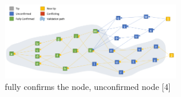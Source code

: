 \begin{figure}[H]
	\centering
	\includegraphics[width=3.0in]{figures/screenshot012.png}
	\caption{fully confirms the node, unconfirmed node [4]}
	\label{simulationfigure}
\end{figure}

